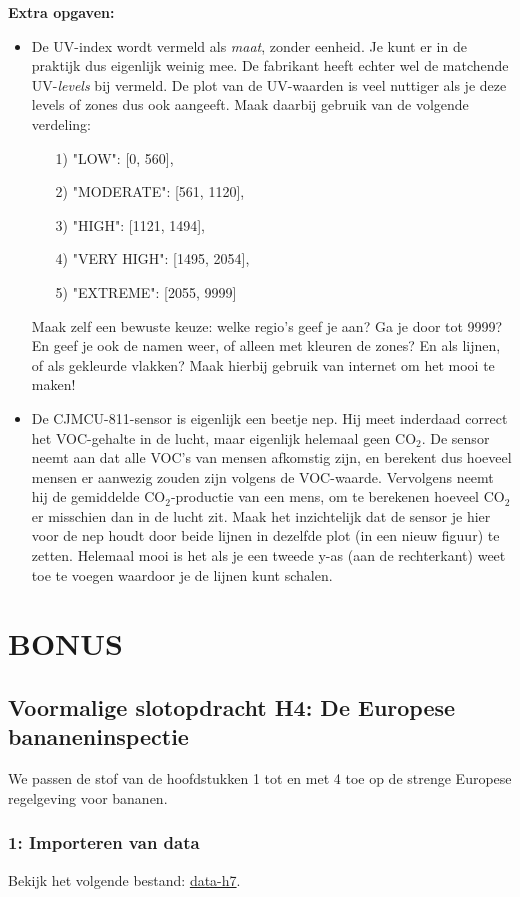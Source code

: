\documentclass[a4paper,11pt, fleqn]{article}
\newcommand{\ditwc}{Naam van het huidige werkcollege}
\begin{document}
\bigbreak
{\bf Extra opgaven:}
\begin{itemize}
	\item De UV-index wordt vermeld als {\it maat}, zonder eenheid. Je kunt er in de praktijk dus eigenlijk weinig mee. De fabrikant heeft echter wel de matchende UV-{\it levels} bij vermeld. De plot van de UV-waarden is veel nuttiger als je deze levels of zones dus ook aangeeft. Maak daarbij gebruik van de volgende verdeling:
	\begin{itemize}
		\item[1)] "LOW": [0, 560],
		\item[2)] "MODERATE": [561, 1120],
		\item[3)] "HIGH": [1121, 1494],
		\item[4)] "VERY HIGH": [1495, 2054],
		\item[5)] "EXTREME": [2055, 9999] 
	\end{itemize}
	Maak zelf een bewuste keuze: welke regio's geef je aan? Ga je door tot 9999? En geef je ook de namen weer, of alleen met kleuren de zones? En als lijnen, of als gekleurde vlakken? Maak hierbij gebruik van internet om het mooi te maken!
	\item De CJMCU-811-sensor is eigenlijk een beetje nep. Hij meet inderdaad correct het VOC-gehalte in de lucht, maar eigenlijk helemaal geen CO$_2$. De sensor neemt aan dat alle VOC's van mensen afkomstig zijn, en berekent dus hoeveel mensen er aanwezig zouden zijn volgens de VOC-waarde. Vervolgens neemt hij de gemiddelde CO$_2$-productie van een mens, om te berekenen hoeveel CO$_2$ er misschien dan in de lucht zit. Maak het inzichtelijk dat de sensor je hier voor de nep houdt door beide lijnen in dezelfde plot (in een nieuw figuur) te zetten. Helemaal mooi is het als je een tweede y-as (aan de rechterkant) weet toe te voegen waardoor je de lijnen kunt schalen.
\end{itemize}


\clearpage
\renewcommand{\ditwc}{BONUS}
\section{BONUS}
\subsection{Voormalige slotopdracht H4: De Europese bananeninspectie}
We passen de stof van de hoofdstukken 1 tot en met 4 toe op de strenge Europese regelgeving voor bananen.

\subsubsection*{1: Importeren van data}
Bekijk het volgende bestand: 
\href{https://github.com/Ichthus-College-IN/Python-x-Meet-je-leefomgeving/tree/main/inc/data_h7.txt}{data-h7}.
\end{document}
